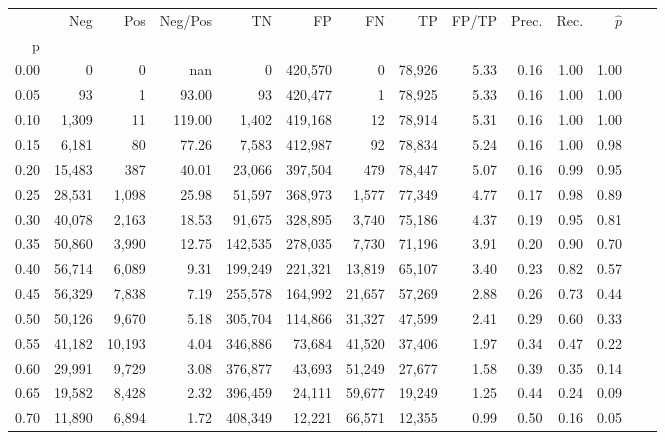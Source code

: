 \begin{tabular}{rrrrrrrrrrrrrr}
\toprule
{} &     Neg &     Pos & Neg/Pos &       TN &       FP &      FN &      TP & FP/TP & Prec. &  Rec. & $\hat{p}$ \\
p    &         &         &         &          &          &         &         &       &       &       &           \\
\midrule
0.00 &       0 &       0 &     nan &        0 &  420,570 &       0 &  78,926 &  5.33 &  0.16 &  1.00 &      1.00 \\
0.05 &      93 &       1 &   93.00 &       93 &  420,477 &       1 &  78,925 &  5.33 &  0.16 &  1.00 &      1.00 \\
0.10 &   1,309 &      11 &  119.00 &    1,402 &  419,168 &      12 &  78,914 &  5.31 &  0.16 &  1.00 &      1.00 \\
0.15 &   6,181 &      80 &   77.26 &    7,583 &  412,987 &      92 &  78,834 &  5.24 &  0.16 &  1.00 &      0.98 \\
0.20 &  15,483 &     387 &   40.01 &   23,066 &  397,504 &     479 &  78,447 &  5.07 &  0.16 &  0.99 &      0.95 \\
0.25 &  28,531 &   1,098 &   25.98 &   51,597 &  368,973 &   1,577 &  77,349 &  4.77 &  0.17 &  0.98 &      0.89 \\
0.30 &  40,078 &   2,163 &   18.53 &   91,675 &  328,895 &   3,740 &  75,186 &  4.37 &  0.19 &  0.95 &      0.81 \\
0.35 &  50,860 &   3,990 &   12.75 &  142,535 &  278,035 &   7,730 &  71,196 &  3.91 &  0.20 &  0.90 &      0.70 \\
0.40 &  56,714 &   6,089 &    9.31 &  199,249 &  221,321 &  13,819 &  65,107 &  3.40 &  0.23 &  0.82 &      0.57 \\
0.45 &  56,329 &   7,838 &    7.19 &  255,578 &  164,992 &  21,657 &  57,269 &  2.88 &  0.26 &  0.73 &      0.44 \\
0.50 &  50,126 &   9,670 &    5.18 &  305,704 &  114,866 &  31,327 &  47,599 &  2.41 &  0.29 &  0.60 &      0.33 \\
0.55 &  41,182 &  10,193 &    4.04 &  346,886 &   73,684 &  41,520 &  37,406 &  1.97 &  0.34 &  0.47 &      0.22 \\
0.60 &  29,991 &   9,729 &    3.08 &  376,877 &   43,693 &  51,249 &  27,677 &  1.58 &  0.39 &  0.35 &      0.14 \\
0.65 &  19,582 &   8,428 &    2.32 &  396,459 &   24,111 &  59,677 &  19,249 &  1.25 &  0.44 &  0.24 &      0.09 \\
0.70 &  11,890 &   6,894 &    1.72 &  408,349 &   12,221 &  66,571 &  12,355 &  0.99 &  0.50 &  0.16 &      0.05 \\

\end{tabular}
